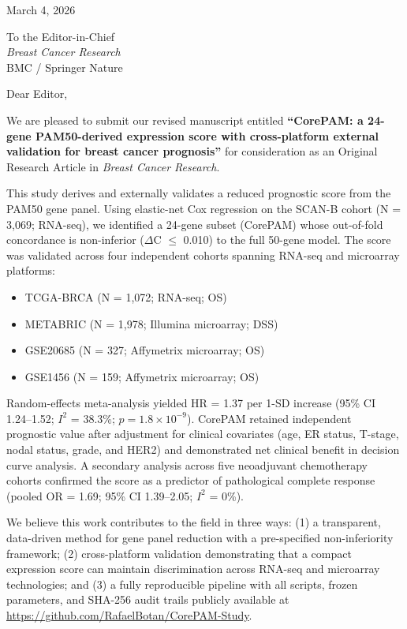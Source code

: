 \documentclass[11pt]{article}
\begin{document}
\begin{flushright}
March 4, 2026
\end{flushright}

\bigskip

\noindent To the Editor-in-Chief\\
\textit{Breast Cancer Research}\\
BMC / Springer Nature

\bigskip

\noindent Dear Editor,

\bigskip

We are pleased to submit our revised manuscript entitled \textbf{``CorePAM: a 24-gene PAM50-derived expression score with cross-platform external validation for breast cancer prognosis''} for consideration as an Original Research Article in \textit{Breast Cancer Research}.

This study derives and externally validates a reduced prognostic score from the PAM50 gene panel. Using elastic-net Cox regression on the SCAN-B cohort (N = 3,069; RNA-seq), we identified a 24-gene subset (CorePAM) whose out-of-fold concordance is non-inferior ($\Delta$C $\leq$ 0.010) to the full 50-gene model. The score was validated across four independent cohorts spanning RNA-seq and microarray platforms:

\begin{itemize}
  \item TCGA-BRCA (N = 1,072; RNA-seq; OS)
  \item METABRIC (N = 1,978; Illumina microarray; DSS)
  \item GSE20685 (N = 327; Affymetrix microarray; OS)
  \item GSE1456 (N = 159; Affymetrix microarray; OS)
\end{itemize}

Random-effects meta-analysis yielded HR = 1.37 per 1-SD increase (95\% CI 1.24--1.52; $I^2$ = 38.3\%; $p = 1.8 \times 10^{-9}$). CorePAM retained independent prognostic value after adjustment for clinical covariates (age, ER status, T-stage, nodal status, grade, and HER2) and demonstrated net clinical benefit in decision curve analysis. A secondary analysis across five neoadjuvant chemotherapy cohorts confirmed the score as a predictor of pathological complete response (pooled OR = 1.69; 95\% CI 1.39--2.05; $I^2$ = 0\%).

We believe this work contributes to the field in three ways: (1) a transparent, data-driven method for gene panel reduction with a pre-specified non-inferiority framework; (2) cross-platform validation demonstrating that a compact expression score can maintain discrimination across RNA-seq and microarray technologies; and (3) a fully reproducible pipeline with all scripts, frozen parameters, and SHA-256 audit trails publicly available at \url{https://github.com/RafaelBotan/CorePAM-Study}.
\end{document}
